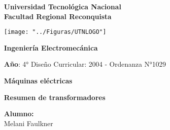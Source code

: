 \documentclass[a4paper, 15pt,titlepage]{article}
\begin{document}
	\begin{titlepage}
		\begin{center}		
			{\huge \textbf{Universidad Tecnológica Nacional}}\\
			{\huge \textbf{Facultad Regional Reconquista}}
			
			\vspace{1cm}
			
			\texttt{[image: "../Figuras/UTNLOGO"]}\\
			
			\vspace{1cm}
			
			{\huge\textbf{Ingeniería Electromecánica}}
			
			\vspace{1cm}
			
			{\textbf{Año}: 4°} \hspace{5cm}  {Diseño Curricular: 2004 - Ordenanza N°1029 }
			
			\vspace{1cm}
			
			{{\LARGE  \textbf{Máquinas eléctricas}}}
			\vspace{1cm}
			
			{\LARGE \textbf{Resumen de transformadores}}
			
		\end{center}
		
		\begin{flushleft}
			\Large
			\textbf{Alumno:}\\
			\vspace{5mm}
			\hspace{3cm}Melani Faulkner
		\end{flushleft}
	\end{titlepage}
	
\end{document}
